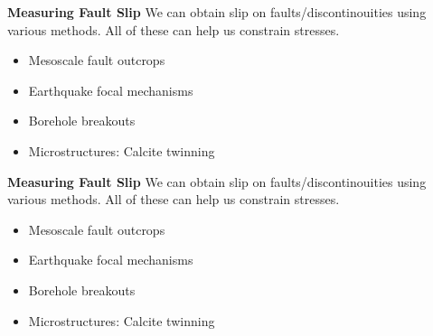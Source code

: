 \documentclass[11pt]{beamer}
\newcommand{\hl}[1]{\textcolor{myhl}{#1}}
\begin{document}
\begin{frame}{\textbf{Measuring Fault Slip}}
    We can obtain slip on faults/discontinouities using various methods. All of these can help us constrain stresses.
    \begin{itemize}
        \item<1-> Mesoscale fault outcrops
        \item<2-> Earthquake focal mechanisms
        \item<3-> Borehole breakouts
        \item<4-> Microstructures: Calcite twinning
    \end{itemize}
\end{frame}
\begin{frame}{\textbf{Measuring Fault Slip}}
    We can obtain slip on faults/discontinouities using various methods. All of these can help us constrain stresses.
    \begin{itemize}
        \item Mesoscale fault outcrops
        \item \hl{Earthquake focal mechanisms}
        \item Borehole breakouts
        \item Microstructures: Calcite twinning
    \end{itemize}
\end{frame}
\end{document}
